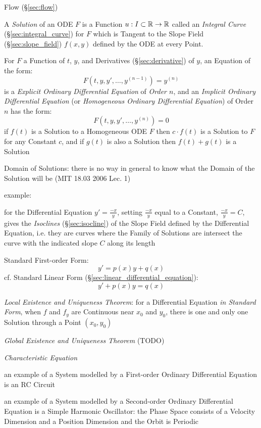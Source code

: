 \fist Flow (\S\ref{sec:flow})

A \emph{Solution} of an ODE $F$ is a Function $u : I \subset \mathbb{R} \rightarrow
\mathbb{R}$ called an \emph{Integral Curve} (\S\ref{sec:integral_curve}) for $F$
which is Tangent to the Slope Field (\S\ref{sec:slope_field}) $f(x,y)$ defined
by the ODE at every Point.

For $F$ a Function of $t$, $y$, and Derivatives (\S\ref{sec:derivative}) of
$y$, an Equation of the form:
\[
  F(t,y,y',\ldots,y^{(n-1)}) = y^{(n)}
\]
is a \emph{Explicit Ordinary Differential Equation} of \emph{Order $n$}, and an
\emph{Implicit Ordinary Differential Equation} (or \emph{Homogeneous Ordinary
  Differential Equation}) of Order $n$ has the form:
\[
  F(t,y,y',\ldots,y^{(n)}) = 0
\]
if $f(t)$ is a Solution to a Homogeneous ODE $F$ then $c\cdot{f(t)}$ is a
Solution to $F$ for any Constant $c$, and if $g(t)$ is also a Solution then
$f(t) + g(t)$ is a Solution


Domain of Solutions: there is no way in general to know what the Domain of the
Solution will be (MIT 18.03 2006 Lec. 1)

example:

for the Differential Equation $y' = \frac{-x}{y}$, setting $\frac{-x}{y}$ equal
to a Constant, $\frac{-x}{y} = C$, gives the \emph{Isoclines}
(\S\ref{sec:isocline}) of the Slope Field defined by the Differential Equation,
i.e. they are curves where the Family of Solutions are intersect the
curve with the indicated slope $C$ along its length

Standard First-order Form:
\[
  y' = p(x) y + q(x)
\]
cf. Standard Linear Form (\S\ref{sec:linear_differential_equation}):
\[
  y' + p(x) y = q(x)
\]

\emph{Local Existence and Uniqueness Theorem}: for a Differential Equation
\emph{in Standard Form}, when $f$ and $f_y$ are Continuous near $x_0$ and
$y_0$, there is one and only one Solution through a Point $(x_0, y_0)$

\emph{Global Existence and Uniqueness Theorem} (TODO)


\emph{Characteristic Equation}

an example of a System modelled by a First-order Ordinary Differential Equation
is an RC Circuit

an example of a System modelled by a Second-order Ordinary Differential
Equation is a Simple Harmonic Oscillator: the Phase Space consists of a
Velocity Dimension and a Position Dimension and the Orbit is Periodic


